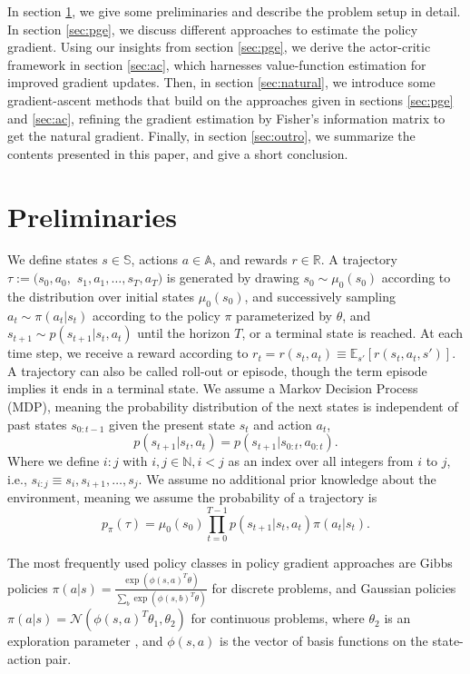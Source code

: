\documentclass[conference, final]{IEEEtran}
\begin{document}
In section \ref{sec:prel}, we give some preliminaries and describe the problem setup in detail. 
In section \ref{sec:pge}, we discuss different approaches to estimate the policy gradient. 
Using our insights from section \ref{sec:pge}, we derive the actor-critic framework in section \ref{sec:ac}, which harnesses value-function estimation for improved gradient updates. 
Then, in section \ref{sec:natural}, we introduce some gradient-ascent methods that build on the approaches given in sections \ref{sec:pge} and \ref{sec:ac}, refining the gradient estimation by Fisher's information matrix to get the natural gradient. 
Finally, in section \ref{sec:outro}, we summarize the contents presented in this paper, and give a short conclusion.

\section{Preliminaries}
\label{sec:prel}

We define states $s \in \mathbb{S}$, actions $a \in \mathbb{A}$, and rewards $r \in \mathbb{R}$. 
A trajectory $\tau := (s_0, a_0, $ $s_1, a_1, \dots, s_T, a_T)$ is generated by drawing $s_0 \sim \mu_0(s_0)$ according to the distribution over initial states $\mu_0(s_0)$, and successively sampling $a_t \sim \pi(a_t|s_t)$ according to the policy $\pi$ parameterized by $\theta$, and $s_{t+1} \sim p(s_{t+1}|s_t,a_t)$ until the horizon $T$, or a terminal state is reached. 
At each time step, we receive a reward according to $r_t = r(s_t, a_t) \equiv \mathbb{E}_{s'}\left[r(s_t,a_t,s')\right]$. 
A trajectory can also be called roll-out or episode, though the term episode implies it ends in a terminal state.
We assume a Markov Decision Process (MDP), meaning the probability distribution of the next states is independent of past states $s_{0:t-1}$ given the present state $s_t$ and action $a_t$, 
\begin{equation}
	p(s_{t+1}|s_t,a_t)=p(s_{t+1}|s_{0:t},a_{0:t}).
\end{equation}
Where we define $i:j$ with $i,j \in \mathbb{N}, i < j$ as an index over all integers from $i$ to $j$, i.e., $s_{i:j} \equiv s_i, s_{i+1}, \dots, s_j$. 
We assume no additional prior knowledge about the environment, meaning we assume the probability of a trajectory is 
\begin{equation}
	p_\pi(\tau) = \mu_0(s_0) \prod_{t=0}^{T-1} p(s_{t+1}|s_t, a_t) \pi(a_t|s_t).
\end{equation}

The most frequently used policy classes in policy gradient approaches are Gibbs policies $\pi(a|s) = \frac{\exp(\phi(s,a)^T\theta)}{\sum_b \exp(\phi(s,b)^T\theta)}$ \cite{Sutton:1999:PGM:3009657.3009806,Bagnell2004LearningD} for discrete problems, and Gaussian policies $\pi(a|s) = \mathcal{N}(\phi(s,a)^T\theta_1,\theta_2)$ for continuous problems, where $\theta_2$ is an exploration parameter \cite{Williams92simplestatistical,peter:article:1996}, and $\phi(s,a)$ is the vector of basis functions on the state-action pair.
\end{document}
